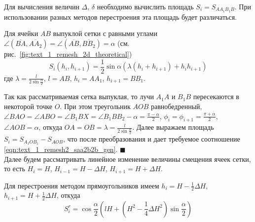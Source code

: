 Для вычисления величин $\Delta$, $\delta$ необходимо вычислить площадь $S_i = S_{AA_1B_1B}$.
При использовании разных методов перестроения эта площадь будет различаться.

\begin{lemma}\label{lem:text_1_remesh2_vypukl_lemma}
Для ячейки $AB$ выпуклой сетки с равными углами $\angle (\overline{BA}, \overline{AA_2}) = \angle (\overline{AB}, \overline{BB_2}) = \alpha$ (см. рис.~\ref{fig:text_1_remesh_2d_theoretical})
\begin{equation}\label{eqn:text_1_remesh2_saa2b2b_gen}
S_i(h_i, h_{i + 1}) = \frac{1}{2} \sin \alpha \left( \lambda(h_i + h_{i+1}) + h_ih_{i+1} \right)
\end{equation}
где $\lambda = \frac{l}{2 \sin \frac{\alpha}{2}}$, $l = AB$, $h_i = AA_1$, $h_{i + 1} = BB_1$.
\end{lemma}

Так как рассматриваемая сетка выпуклая, то лучи $A_1A$ и $B_1B$ пересекаются в некоторой точке $O$.
При этом треугольник $AOB$ равнобедренный, $\angle BAO = \angle ABO = \angle B_1BX = \angle B_1BB_2 - \alpha = \frac{\pi - \alpha}{2}$, $\phi_i = \phi_{i + 1} = \frac{\pi + \alpha}{2}$, $\angle AOB = \alpha$, откуда $OA = OB = \lambda = \frac{l}{2 \sin \frac{\alpha}{2}}$.
Далее выражаем площадь $S_i = S_{A_1OB_1} - S_{AOB}$, что после преобразования и дает требуемое соотношение \eqref{eqn:text_1_remesh2_saa2b2b_gen}.
$\blacksquare$\\

Далее будем рассматривать линейное изменение величины смещения ячеек сетки, то есть $H_i = H$, $H_{i - 1} = H - \Delta H$, $H_{i + 1} = H + \Delta H$.

Для перестроения методом прямоугольников имеем $h_i = H - \frac{1}{2} \Delta H$, $h_{i + 1} = H + \frac{1}{2} \Delta H$, откуда
\begin{equation}\label{eqn:text_1_remesh2_s_rect}
	S_i^r = \cos \frac{\alpha}{2} \left( lH + \left( H^2 - \frac{1}{4} \Delta H^2 \right) \sin \frac{\alpha}{2} \right)
\end{equation}

